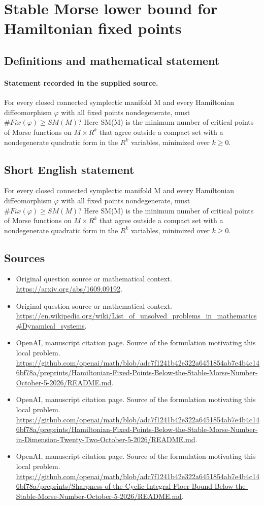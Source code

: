 \documentclass[11pt]{article}
\begin{document}
\section*{Stable Morse lower bound for Hamiltonian fixed points}\label{statement}
\subsection{Definitions and mathematical statement}
\paragraph{Statement recorded in the supplied source.}
For every closed connected symplectic manifold M and every Hamiltonian diffeomorphism $\varphi $ with all fixed points nondegenerate, must $\#Fix(\varphi )\geq SM(M)$? Here SM(M) is the minimum number of critical points of Morse functions on $M×R^k$ that agree outside a compact set with a nondegenerate quadratic form in the $R^k$ variables, minimized over $k\geq 0$.
\subsection{Short English statement}
For every closed connected symplectic manifold M and every Hamiltonian diffeomorphism $\varphi $ with all fixed points nondegenerate, must $\#Fix(\varphi )\geq SM(M)$? Here SM(M) is the minimum number of critical points of Morse functions on $M×R^k$ that agree outside a compact set with a nondegenerate quadratic form in the $R^k$ variables, minimized over $k\geq 0$.
\subsection{Sources}
\begin{itemize}
\item[S1] Original question source or mathematical context.
\url{https://arxiv.org/abs/1609.09192}.
\item[S2] Original question source or mathematical context.
\url{https://en.wikipedia.org/wiki/List_of_unsolved_problems_in_mathematics#Dynamical_systems}.
\item[S3] OpenAI, manuscript citation page. Source of the formulation motivating this local problem.
\url{https://github.com/openai/math/blob/adc7f1241b42e322a6451854ab7e4b4c146bf78a/preprints/Hamiltonian-Fixed-Points-Below-the-Stable-Morse-Number-October-5-2026/README.md}.
\item[S4] OpenAI, manuscript citation page. Source of the formulation motivating this local problem.
\url{https://github.com/openai/math/blob/adc7f1241b42e322a6451854ab7e4b4c146bf78a/preprints/Hamiltonian-Fixed-Points-Below-the-Stable-Morse-Number-in-Dimension-Twenty-Two-October-5-2026/README.md}.
\item[S5] OpenAI, manuscript citation page. Source of the formulation motivating this local problem.
\url{https://github.com/openai/math/blob/adc7f1241b42e322a6451854ab7e4b4c146bf78a/preprints/Sharpness-of-the-Cyclic-Integral-Floer-Bound-Below-the-Stable-Morse-Number-October-5-2026/README.md}.
\end{itemize}
\end{document}
